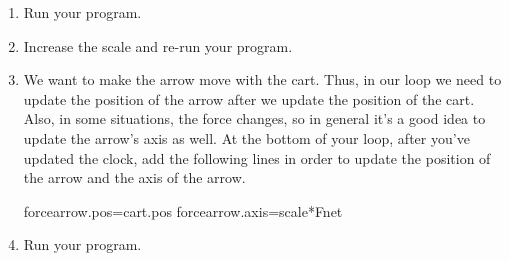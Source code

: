\begin{enumerate}
\item Run your program.

\item Increase the scale and re-run your program.



\item We want to make the arrow move with the cart. Thus, in our loop we need to update the position of the arrow after we update the position of the cart. Also, in some situations, the force changes, so in general it's a good idea to update the arrow's axis as well. At the bottom of your  loop, after you've updated the clock, add the following lines in order to update the position of the arrow and the axis of the arrow.

\begin{myvpython}
	forcearrow.pos=cart.pos
	forcearrow.axis=scale*Fnet
\end{myvpython}

\item Run your program.

\end{enumerate}

\report

